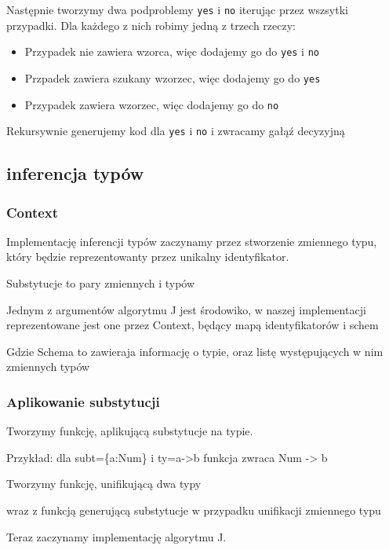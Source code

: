 \documentclass{article}
\begin{document}
Następnie tworzymy dwa podproblemy \lstinline{yes} i \lstinline{no} iterując przez wszsytki przypadki. Dla każdego z nich robimy jedną z trzech rzeczy:
\begin{itemize}
  \item Przypadek nie zawiera wzorca, więc dodajemy go do \lstinline{yes} i \lstinline{no}
        
  \item Przpadek zawiera szukany wzorzec, więc dodajemy go do \lstinline{yes}
        
  \item Przypadek zawiera wzorzec, więc dodajemy go do \lstinline{no}
        
\end{itemize}

Rekursywnie generujemy kod dla \lstinline{yes} i \lstinline{no} i zwracamy gałąź decyzyjną

\subsection{inferencja typów}
\subsubsection{Context}
Implementację inferencji typów zaczynamy przez stworzenie zmiennego typu, który będzie reprezentowanty przez unikalny identyfikator.

Substytucje to pary zmiennych i typów

Jednym z argumentów algorytmu J jest środowiko, w naszej implementacji reprezentowane jest one przez Context, będący mapą identyfikatorów i schem

Gdzie Schema to zawieraja informację o typie, oraz listę występujących w nim zmiennych typów


\subsubsection{Aplikowanie substytucji}
Tworzymy funkcję, aplikującą substytucje na typie.

Przykład: dla subt=\{a:Num\} i ty=a->b funkcja zwraca Num -> b

Tworzymy funkcję, unifikującą dwa typy

wraz z funkcją generującą substytucje w przypadku unifikacji zmiennego typu

Teraz zaczynamy implementację algorytmu J.
\end{document}
